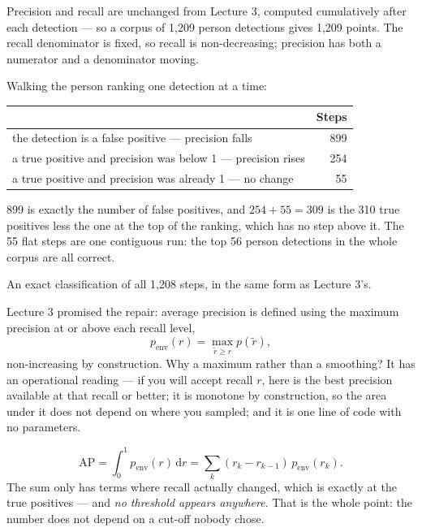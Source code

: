 \documentclass[11pt,a4paper]{article}
\begin{document}
Precision and recall are unchanged from Lecture 3, computed cumulatively after
each detection --- so a corpus of 1{,}209 person detections gives 1{,}209
points. The recall denominator is fixed, so recall is non-decreasing; precision
has both a numerator and a denominator moving.

\begin{keybox}[title={Every step accounted for, exactly}]
Walking the person ranking one detection at a time:

\begin{center}
\small
\begin{tabular}{lr}
\toprule
& \textbf{Steps} \\
\midrule
the detection is a false positive --- precision falls & 899 \\
a true positive and precision was below 1 --- precision rises & 254 \\
a true positive and precision was already 1 --- no change & 55 \\
\bottomrule
\end{tabular}
\end{center}

899 is exactly the number of false positives, and $254 + 55 = 309$ is the 310
true positives less the one at the top of the ranking, which has no step above
it. The 55 flat steps are one contiguous run: the top 56 person detections in
the whole corpus are all correct.

An exact classification of all 1{,}208 steps, in the same form as Lecture 3's.
\end{keybox}

Lecture 3 promised the repair: average precision is defined using the maximum
precision at or above each recall level,
\[ p_{\text{env}}(r) = \max_{\tilde r \ge r} p(\tilde r), \]
non-increasing by construction. Why a maximum rather than a smoothing? It has
an operational reading --- if you will accept recall $r$, here is the best
precision available at that recall or better; it is monotone by construction,
so the area under it does not depend on where you sampled; and it is one line
of code with no parameters.

\[ \mathrm{AP} = \int_0^1 p_{\text{env}}(r)\,\mathrm{d}r
   = \sum_k (r_k - r_{k-1})\,p_{\text{env}}(r_k). \]
The sum only has terms where recall actually changed, which is exactly at the
true positives --- and \emph{no threshold appears anywhere}. That is the whole
point: the number does not depend on a cut-off nobody chose.
\end{document}
